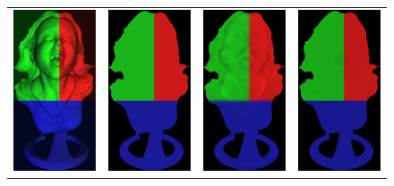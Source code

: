 \begin{figure}[!ht]
\centering
\setlength{\tabcolsep}{0.1em} %
 {\renewcommand{\arraystretch}{0.6}%
\begin{tabular}{c|c c c}
   \includegraphics[height = 0.32\linewidth]{figures/methodology/ratio_syn_rgb.pdf} \hspace{0.1em}
   &\hspace{0.1em}
   \includegraphics[height = 0.32\linewidth]{figures/methodology/ratio_syn_albedoGT.pdf} &
   \includegraphics[height = 0.32\linewidth]{figures/methodology/ratio_syn_albedoNR.pdf} &
   \includegraphics[height = 0.32\linewidth]{figures/methodology/ratio_syn_albedoR.pdf} \\
   

\end{tabular}}
\end{figure}
